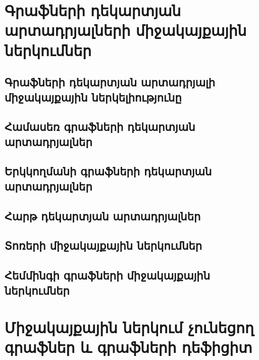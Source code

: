 \documentclass[notheorems]{beamer}
\begin{document}






\section[Դեկարտյան արտադրյալների ներկումներ]{Գրաֆների դեկարտյան արտադրյալների միջակայքային ներկումներ}

\subsection{Գրաֆների դեկարտյան արտադրյալի միջակայքային ներկելիությունը}




\subsection{Համասեռ գրաֆների դեկարտյան արտադրյալներ}




\subsection{Երկկողմանի գրաֆների դեկարտյան արտադրյալներ}




\subsection{Հարթ դեկարտյան արտադրյալներ}




\subsection{Տոռերի միջակայքային ներկումներ}




\subsection{Հեմմինգի գրաֆների միջակայքային ներկումներ}






\section[Միջակայքային ներկում չունեցող գրաֆներ]{Միջակայքային ներկում չունեցող գրաֆներ և գրաֆների դեֆիցիտ}
% 
\end{document}
